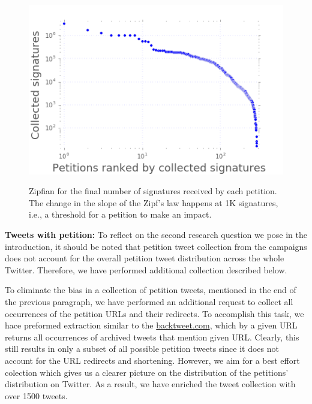 \begin{figure}
\centering
\caption{Zipfian for the final number of signatures received by each petition. The change in the slope of the Zipf's law happens at 1K signatures, i.e., a threshold for a petition to make an impact.}
\includegraphics[scale=0.36]{figures/petitionsVSrank.png}
\label{fig:signatures_vs_rank}
\end{figure}


\textbf{Tweets with petition:}
To reflect on the second research question we pose in the introduction, it should be noted that petition tweet collection from the campaigns does not account for the overall petition tweet distribution across the whole Twitter. Therefore, we have performed additional collection described below.

To eliminate the bias in a collection of petition tweets, mentioned in the end of the previous paragraph, we have performed an additional request to collect all occurrences of the petition URLs and their redirects. To accomplish this task, we hace preformed extraction similar to the \url{backtweet.com}, which by a given URL returns all occurrences of archived tweets that mention given URL.
Clearly, this still results in only a subset of all possible petition tweets since it does not account for the URL redirects and shortening. However, we aim for a best effort colection which gives us a clearer picture on the distribution of the petitions' distribution on Twitter.
As a result, we have enriched the tweet collection with over 1500 tweets.

